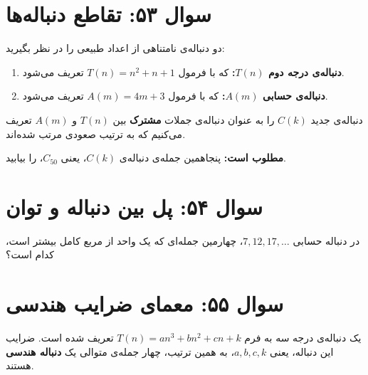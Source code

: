 \documentclass[12pt]{article}
\begin{document}
	\vspace{1cm}
	\hrulefill
	\vspace{1cm}
	
	\section*{سوال ۵۳: تقاطع دنباله‌ها}
	دو دنباله‌ی نامتناهی از اعداد طبیعی را در نظر بگیرید:
	\begin{enumerate}[label=(\roman*)]
		\item \textbf{دنباله‌ی درجه دوم \(T(n)\):} که با فرمول \( T(n) = n^2 + n + 1 \) تعریف می‌شود.
		\item \textbf{دنباله‌ی حسابی \(A(m)\):} که با فرمول \( A(m) = 4m + 3 \) تعریف می‌شود.
	\end{enumerate}
	\vspace{0.5cm}
	
	دنباله‌ی جدید \(C(k)\) را به عنوان دنباله‌ی جملات \textbf{مشترک} بین \(T(n)\) و \(A(m)\) تعریف می‌کنیم که به ترتیب صعودی مرتب شده‌اند.
	\vspace{0.5cm}
	
	\textbf{مطلوب است:} پنجاهمین جمله‌ی دنباله‌ی \(C(k)\)، یعنی \(C_{50}\)، را بیابید.
	
	\vspace{1cm}
	\hrulefill
	\vspace{1cm}
	
	\section*{سوال ۵۴: پل بین دنباله و توان}
	در دنباله حسابی \( 7, 12, 17, \dots \)، چهارمین جمله‌ای که یک واحد از مربع کامل بیشتر است، کدام است؟
	
	\vspace{1cm}
	\hrulefill
	\vspace{1cm}
	
	\section*{سوال ۵۵: معمای ضرایب هندسی}
	یک دنباله‌ی درجه سه به فرم \( T(n) = an^3 + bn^2 + cn + k \) تعریف شده است.
	ضرایب این دنباله، یعنی \(a, b, c, k\)، به همین ترتیب، چهار جمله‌ی متوالی یک \textbf{دنباله هندسی} هستند.
	\vspace{0.5cm}
	
\end{document}
